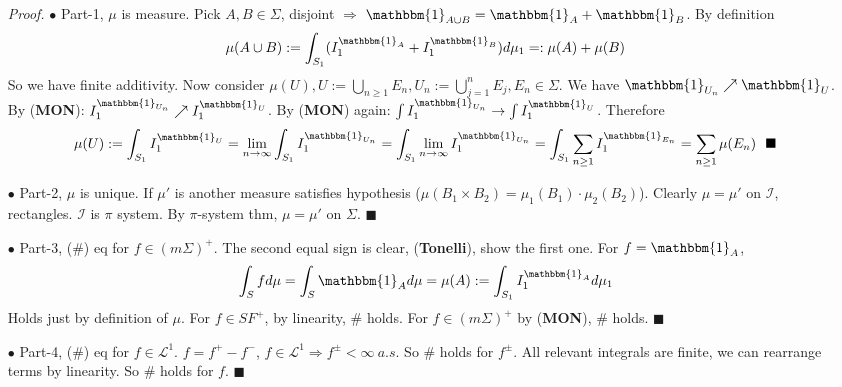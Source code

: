 \documentclass[a4paper,12pt,twoside]{book}
\begin{document}
\begin{itemize}
	\item[\textit{Proof.}] $\bullet$ Part-1, $\mu$ is measure. \newline
	Pick $A,B\in \Sigma$, disjoint $\Rightarrow$ $\mathbbm{1}_{A\cup B}=\mathbbm{1}_{A}+\mathbbm{1}_{B}$. By definition
	\begin{equation}
		\mu(A\cup B):=\int_{S_1} (I^{\mathbbm{1}_{A}}_1+I^{\mathbbm{1}_{B}}_1) d\mu_1=:\mu(A)+\mu(B)
	\end{equation}
	So we have finite additivity. Now consider $\mu(U), U:=\bigcup_{n\geq 1}E_n, U_n:=\bigcup_{j=1}^n E_j, E_n\in \Sigma$. We have $\mathbbm{1}_{U_n}\nearrow \mathbbm{1}_{U}$. 
	By (\textbf{MON}): $I_1^{\mathbbm{1}_{U_n}}\nearrow I^{\mathbbm{1}_{U}}_1$.\newline
	By (\textbf{MON}) again: $\int I_1^{\mathbbm{1}_{U_n}} \to \int I_1^{\mathbbm{1}_{U}}$. \newline
	Therefore
	\begin{equation}
		\mu(U):=\int_{S_1}I_1^{\mathbbm{1}_{U}} = \lim\limits_{n\rightarrow\infty}\int_{S_1}I_1^{\mathbbm{1}_{U_n}}=\int_{S_1}\lim\limits_{n\rightarrow\infty}I_1^{\mathbbm{1}_{U_n}}=\int_{S_1}\sum_{n\geq 1}I_1^{\mathbbm{1}_{E_n}}=\sum_{n\geq 1}\mu(E_n)~~\blacksquare
	\end{equation}

	$\bullet$ Part-2, $\mu$ is unique. \newline
	If $\mu'$ is another measure satisfies hypothesis ($\mu(B_1 \times B_2)=\mu_1(B_1)\cdot \mu_2(B_2)$). Clearly $\mu=\mu'$ on $\mathcal{I}$, rectangles. $\mathcal{I}$ is $\pi$ system. By $\pi$-system thm, $\mu=\mu'$ on $\Sigma$. $\blacksquare$ \newline

	$\bullet$ Part-3, (\#) eq for $f\in (m\Sigma)^+$. \newline
	The second equal sign is clear, (\textbf{Tonelli}), show the first one. \newline
	For $f=\mathbbm{1}_{A}$, 
	\begin{equation}
		\int_S f d\mu=\int_S \mathbbm{1}_{A}d\mu=\mu(A):=\int_{S_1} I^{\mathbbm{1}_{A}}_1 d\mu_1
	\end{equation}
	Holds just by definition of $\mu$.\newline
	For $f\in SF^+$, by linearity, \# holds. \newline
	For $f\in (m\Sigma)^+$ by (\textbf{MON}), \# holds. $\blacksquare$ \newline

	$\bullet$ Part-4, (\#) eq for $f\in \mathcal{L}^1$. \newline
	$f=f^+-f^-$, $f\in \mathcal{L}^1 \Rightarrow f^{\pm}<\infty~a.s$. So \# holds for $f^{\pm}$. All relevant integrals are finite, we can rearrange terms by linearity. So \# holds for $f$. $\blacksquare$



\end{itemize}
\end{document}
